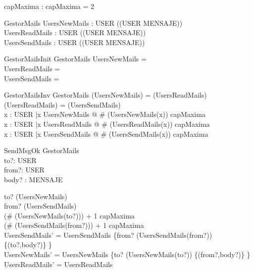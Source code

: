 \begin{zed}
\end{zed}

\begin{axdef}
capMaxima : \nat 
\where
capMaxima = 2 
\end{axdef}

\begin{schema}{GestorMails}
UsersNewMails : USER \pfun (\power(USER \cross MENSAJE)) \\
UsersReadMails : USER \pfun (\power(USER \cross MENSAJE)) \\
UsersSendMails : USER \pfun (\power(USER \cross MENSAJE))
\end{schema}

\begin{schema}{GestorMailsInit}
GestorMails
\where
UsersNewMails = \emptyset \\
UsersReadMails = \emptyset \\
UsersSendMails = \emptyset
\end{schema}

\begin{schema}{GestorMailsInv}
GestorMails
\where
\dom(UsersNewMails) = \dom(UsersReadMails)\\
\dom(UsersReadMails) = \dom(UsersSendMails) \\
\forall x : USER |x \in \dom UsersNewMails @ \# (UsersNewMails(x)) \leq capMaxima \\
\forall x : USER |x \in \dom UsersReadMails @ \# (UsersReadMails(x)) \leq capMaxima \\
\forall x : USER |x \in \dom UsersSendMails @ \# (UsersSendMails(x)) \leq capMaxima 
\end{schema}

\begin{schema}{SendMsgOk}
\Delta GestorMails \\
to?: USER \\
from?: USER \\
body? : MENSAJE\\
\where

to? \in \dom(UsersNewMails) \\
from? \in \dom(UsersSendMails) \\

(\# (UsersNewMails(to?))) + 1 \leq capMaxima \\
(\# (UsersSendMails(from?))) + 1 \leq capMaxima \\

UsersSendMails' = UsersSendMails \oplus \{from? \mapsto (UsersSendMails(from?)) \cup \{(to?,body?)\} \} \\ 
UsersNewMails' = UsersNewMails \oplus \{to? \mapsto (UsersNewMails(to?)) \cup \{(from?,body?)\} \} \\
UsersReadMails' = UsersReadMails

\end{schema}

